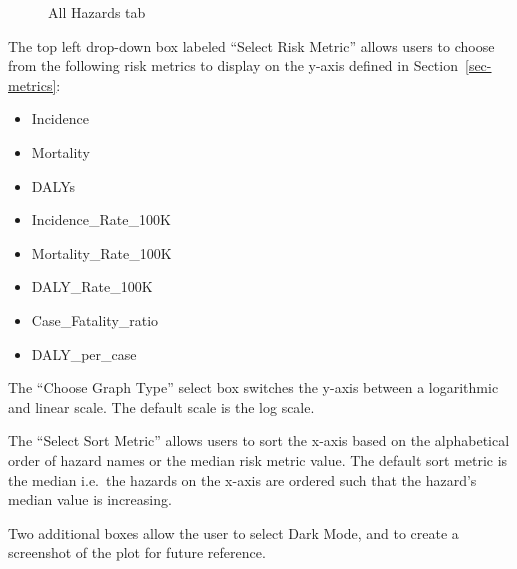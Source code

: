 \documentclass[
  letterpaper,
  DIV=11,
  numbers=noendperiod]{scrartcl}
\providecommand{\tightlist}{%
  \setlength{\itemsep}{0pt}\setlength{\parskip}{0pt}}\usepackage{longtable,booktabs,array}
\begin{document}
\begin{figure}


\caption{\label{fig-all-hazards}All Hazards tab}

\end{figure}%

The top left drop-down box labeled ``Select Risk Metric'' allows users
to choose from the following risk metrics to display on the y-axis
defined in Section~\ref{sec-metrics}:

\begin{itemize}
\tightlist
\item
  Incidence
\item
  Mortality
\item
  DALYs
\item
  Incidence\_Rate\_100K
\item
  Mortality\_Rate\_100K
\item
  DALY\_Rate\_100K
\item
  Case\_Fatality\_ratio
\item
  DALY\_per\_case
\end{itemize}

The ``Choose Graph Type'' select box switches the y-axis between a
logarithmic and linear scale. The default scale is the log scale.

The ``Select Sort Metric'' allows users to sort the x-axis based on the
alphabetical order of hazard names or the median risk metric value. The
default sort metric is the median i.e.~the hazards on the x-axis are
ordered such that the hazard's median value is increasing.

Two additional boxes allow the user to select Dark Mode, and to create a
screenshot of the plot for future reference.
\end{document}
